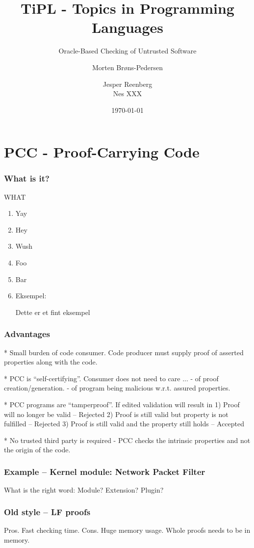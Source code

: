 \documentclass[slidestop,compress,mathserif]{beamer}
\title[]{TiPL - Topics in Programming Languages}
\subtitle{Oracle-Based Checking of Untrusted Software}
\author[Morten Brøns-Pedersen \and Jesper Reenberg \and Nes XXX]
       {Morten Brøns-Pedersen \and
        Jesper Reenberg  \\
        Nes XXX }
\institute[DIKU]{Department of Computer Science}
\date[]{\today}
\begin{document}
\frame[plain]{\titlepage}


\section{PCC - Proof-Carrying Code}
\begin{frame}
\frametitle{What is it?}
 WHAT

 \begin{enumerate}
 \item<1> Yay
 \item<2> Hey
 \item<3> Wush
 \item<4> Foo
 \item<5> Bar
 \item<6>{ Eksempel:
   \begin{example}
     Dette er et fint eksempel
   \end{example}}

 \end{enumerate}
\end{frame}

\begin{frame}
  \frametitle{Advantages}

   * Small burden of code consumer. Code producer must supply proof of asserted
     properties along with the code.

   * PCC is ``self-certifying''. Consumer does not need to care ...
     - of proof creation/generation.
     - of program being malicious w.r.t. assured properties.

   * PCC programs are ``tamperproof''. If edited validation will result in
     1) Proof will no longer be valid -- Rejected
     2) Proof is still valid but property is not fulfilled -- Rejected
     3) Proof is still valid and the property still holds -- Accepted

   * No trusted third party is required
     -  PCC checks the intrinsic properties and not the origin of the code.
\end{frame}

\begin{frame}
  \frametitle{Example -- Kernel module: Network Packet Filter}
  What is the right word: Module? Extension? Plugin?
\end{frame}

\begin{frame}
  \frametitle{Old style -- LF proofs}

  Pros. 
    Fast checking time.
  Cons.
    Huge memory usage. Whole proofs needs to be in memory.
  
\end{frame}
\end{document}
